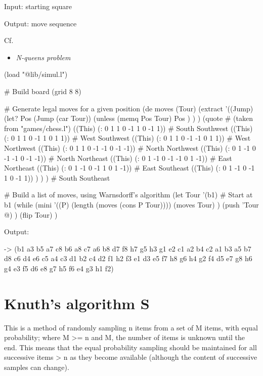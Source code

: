 Input: starting square

Output: move sequence

Cf.

\begin{itemize}
\item \emph{N-queens problem}
\end{itemize}



\begin{wideverbatim}

(load "@lib/simul.l")

# Build board
(grid 8 8)

# Generate legal moves for a given position
(de moves (Tour)
   (extract
      '((Jump)
         (let? Pos (Jump (car Tour))
            (unless (memq Pos Tour)
               Pos ) ) )
      (quote  # (taken from "games/chess.l")
         ((This) (: 0 1  1  0 -1  1  0 -1  1))        # South Southwest
         ((This) (: 0 1  1  0 -1  1  0  1  1))        # West Southwest
         ((This) (: 0 1  1  0 -1 -1  0  1  1))        # West Northwest
         ((This) (: 0 1  1  0 -1 -1  0 -1 -1))        # North Northwest
         ((This) (: 0 1 -1  0 -1 -1  0 -1 -1))        # North Northeast
         ((This) (: 0 1 -1  0 -1 -1  0  1 -1))        # East Northeast
         ((This) (: 0 1 -1  0 -1  1  0  1 -1))        # East Southeast
         ((This) (: 0 1 -1  0 -1  1  0 -1  1)) ) ) )  # South Southeast

# Build a list of moves, using Warnsdorff’s algorithm
(let Tour '(b1)  # Start at b1
   (while
      (mini
         '((P) (length (moves (cons P Tour))))
         (moves Tour) )
      (push 'Tour @) )
   (flip Tour) )

Output:

-> (b1 a3 b5 a7 c8 b6 a8 c7 a6 b8 d7 f8 h7 g5 h3 g1 e2 c1 a2 b4 c2 a1 b3 a5 b7
d8 c6 d4 e6 c5 a4 c3 d1 b2 c4 d2 f1 h2 f3 e1 d3 e5 f7 h8 g6 h4 g2 f4 d5 e7 g8
h6 g4 e3 f5 d6 e8 g7 h5 f6 e4 g3 h1 f2)

\end{wideverbatim}

\pagebreak{}
\section*{Knuth's algorithm S}

This is a method of randomly sampling n items from a set of M items,
with equal probability; where M \textgreater{}= n and M, the number of
items is unknown until the end. This means that the equal probability
sampling should be maintained for all successive items \textgreater{} n
as they become available (although the content of successive samples can
change).

